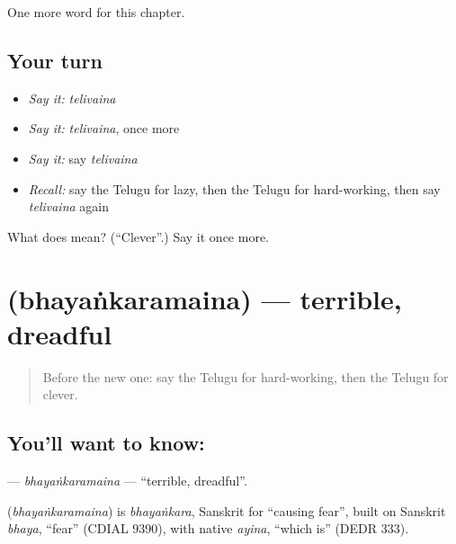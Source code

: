 \begin{grammarlens}[title={What you've built}]
One more word for this chapter.
\end{grammarlens}

\subsection*{Your turn}
\begin{itemize}
\raggedright
  \item \emph{Say it:} \emph{telivaina}
  \item \emph{Say it:} \emph{telivaina}, once more
  \item \emph{Say it:} say \emph{telivaina}
  \item \emph{Recall:} say the Telugu for lazy, then the Telugu for hard-working, then say \emph{telivaina} again
\end{itemize}

\begin{tcolorbox}[breakable,colback=teal!4,colframe=teal!35!black,title={Before you move on}]
What does  mean? (\textquotedblleft{}Clever\textquotedblright{}.) Say it once more.
\end{tcolorbox}
\section[\texorpdfstring{\te{భయంకరమైన} (bhayaṅkaramaina)}{భయంకరమైన (bhayaṅkaramaina)}]{ (bhayaṅkaramaina) — terrible, dreadful}

\label{lesson:TE-C142-bhayankaramaina}



\begin{quote}
Before the new one: say the Telugu for hard-working, then the Telugu for clever.
\end{quote}

\subsection*{You'll want to know: }
\textbf{} — \emph{bhayaṅkaramaina} — \textquotedblleft{}terrible, dreadful\textquotedblright{}.

\begin{cousinweb}
\textbf{} (\emph{bhayaṅkaramaina}) is \emph{bhayaṅkara}, Sanskrit for \textquotedblleft{}causing fear\textquotedblright{}, built on Sanskrit \emph{bhaya}, \textquotedblleft{}fear\textquotedblright{} (CDIAL 9390), with native \emph{ayina}, \textquotedblleft{}which is\textquotedblright{} (DEDR 333).
\end{cousinweb}

